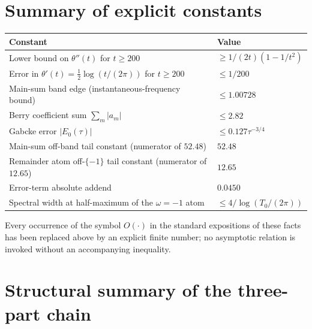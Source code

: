 \documentclass[11pt]{article}
\begin{document}
\section{Summary of explicit constants}\label{sec:constants}

\begin{center}
\begin{tabular}{@{}ll@{}}
\hline
Constant & Value \\
\hline
Lower bound on $\theta''(t)$ for $t\ge 200$ & $\ge 1/(2t)(1-1/t^{2})$ \\
Error in $\theta'(t) = \tfrac12\log(t/(2\pi))$ for $t\ge 200$ & $\le 1/200$ \\
Main-sum band edge (instantaneous-frequency bound) & $\le 1.00728$ \\
Berry coefficient sum $\sum_{m}|a_{m}|$ & $\le 2.82$ \\
Gabcke error $|E_{0}(\tau)|$ & $\le 0.127\tau^{-3/4}$ \\
Main-sum off-band tail constant (numerator of $52.48$) & $52.48$ \\
Remainder atom off-$\{-1\}$ tail constant (numerator of $12.65$) & $12.65$ \\
Error-term absolute addend & $0.0450$ \\
Spectral width at half-maximum of the $\omega=-1$ atom & $\le 4/\log(T_{0}/(2\pi))$ \\
\hline
\end{tabular}
\end{center}

Every occurrence of the symbol $O(\cdot)$ in the standard expositions of these facts has been replaced above by an explicit finite number; no asymptotic relation is invoked without an accompanying inequality.

\section{Structural summary of the three-part chain}
\end{document}
